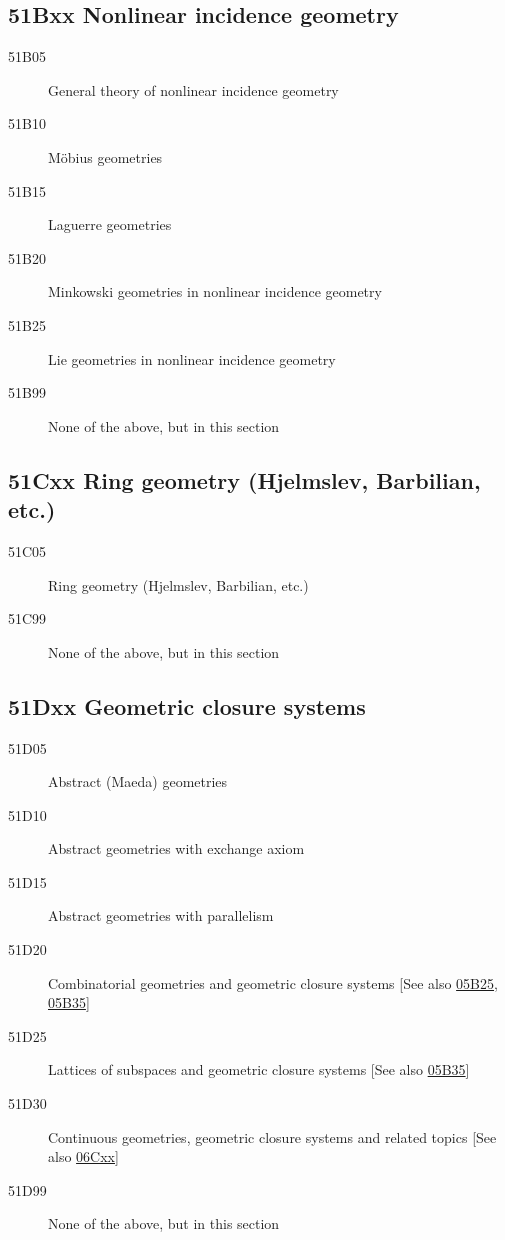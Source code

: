 \documentclass[letterpaper]{article}
\begin{document}
\subsection*{51Bxx  Nonlinear incidence geometry }\label{51Bxx}
\begin{description}  
\item [51B05]\label{51B05} General theory of nonlinear incidence geometry
\item [51B10]\label{51B10} M\"{o}bius geometries
\item [51B15]\label{51B15} Laguerre geometries
\item [51B20]\label{51B20} Minkowski geometries in nonlinear incidence geometry
\item [51B25]\label{51B25} Lie geometries in nonlinear incidence geometry
\item [51B99]\label{51B99} None of the above, but in this section
\end{description}
\subsection*{51Cxx  Ring geometry (Hjelmslev, Barbilian, etc.) }\label{51Cxx}
\begin{description}  
\item [51C05]\label{51C05} Ring geometry (Hjelmslev, Barbilian, etc.)
\item [51C99]\label{51C99} None of the above, but in this section
\end{description}
\subsection*{51Dxx  Geometric closure systems }\label{51Dxx}
\begin{description}  
\item [51D05]\label{51D05} Abstract (Maeda) geometries
\item [51D10]\label{51D10} Abstract geometries with exchange axiom
\item [51D15]\label{51D15} Abstract geometries with parallelism
\item [51D20]\label{51D20} Combinatorial geometries and geometric closure systems [See also \hyperref[05B25]{05B25}, \hyperref[05B35]{05B35}]
\item [51D25]\label{51D25} Lattices of subspaces and geometric closure systems [See also \hyperref[05B35]{05B35}]
\item [51D30]\label{51D30} Continuous geometries, geometric closure systems and related topics [See also \hyperref[06Cxx]{06Cxx}]
\item [51D99]\label{51D99} None of the above, but in this section
\end{description}
\end{document}
